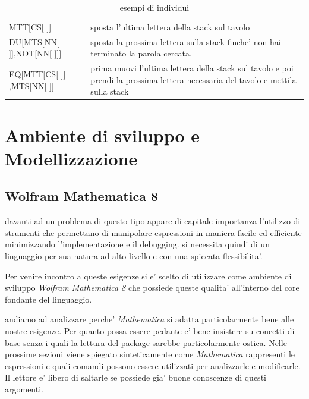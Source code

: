 \documentclass[12pt, a4paper]{article}
\begin{document}
\begin{center}
\begin{table}[hbp]
\begin{tabular}[b]{|l|p{7.5cm}|}
\hline
MTT[CS[ ]] & sposta l'ultima lettera della stack sul tavolo\\
DU[MTS[NN[ ]],NOT[NN[ ]]] & sposta la prossima lettera sulla stack finche' non hai terminato la parola cercata.\\
EQ[MTT[CS[ ]] ,MTS[NN[ ]] & prima muovi l'ultima lettera della stack sul tavolo e poi prendi la prossima lettera necessaria del tavolo e mettila sulla stack \\ 
\hline
\end{tabular}
\caption{esempi di individui}
\label{table:esind}
\end{table}
\end{center}

\section{Ambiente di sviluppo e Modellizzazione}
\subsection{Wolfram Mathematica 8}
davanti ad un problema di questo tipo appare di capitale importanza l'utilizzo di strumenti che permettano di manipolare espressioni in maniera facile ed efficiente minimizzando l'implementazione e il debugging. si necessita quindi di un linguaggio per sua natura ad alto livello e con una spiccata flessibilita'.

Per venire incontro a queste esigenze si e' scelto di utilizzare come ambiente di sviluppo {\itshape Wolfram Mathematica 8} \cite{mathematica8} che possiede queste qualita' all'interno del core fondante del linguaggio.

andiamo ad analizzare perche'  {\itshape Mathematica} \cite{mathematica8} si adatta particolarmente bene alle nostre esigenze.
Per quanto possa essere pedante e' bene insistere su concetti di base senza i quali la lettura del package sarebbe particolarmente ostica. Nelle prossime sezioni viene spiegato sinteticamente come {\itshape Mathematica} rappresenti le espressioni e quali comandi possono essere utilizzati per analizzarle e modificarle. Il lettore e' libero di saltarle se possiede gia' buone conoscenze di questi argomenti.
\end{document}
